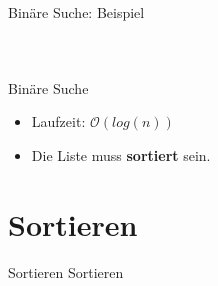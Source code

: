 \documentclass[18pt]{beamer}
\begin{document}
\begin{frame}{Binäre Suche: Beispiel}
\begin{center}
\begin{tabular}{|c|c|c|c|c|c|c|c|c|c|c|c|c|c|c|c|}
            \hline
        \end{tabular}
        \pause
        \begin{tabular}{|c|c|c|c|c|c|c|c|c|c|c|c|c|c|c|c|}
            \hline
            \cellcolor{darkgrey}{3} & \cellcolor{darkgrey}{4} & \cellcolor{darkgrey}{4} & \cellcolor{darkgrey}{5} & \cellcolor{darkgrey}{6} & \cellcolor{darkgrey}{7} & \cellcolor{lime}{8} & \cellcolor{lightgreen}{10} & \cellcolor{darkgrey}{11} & \cellcolor{darkgrey}{14} & \cellcolor{darkgrey}{17} & \cellcolor{darkgrey}{22} & \cellcolor{darkgrey}{24} & \cellcolor{darkgrey}{29} & \cellcolor{darkgrey}{32} & \cellcolor{darkgrey}{42} \\
            \hline
        \end{tabular}
        \pause
        \begin{tabular}{|c|c|c|c|c|c|c|c|c|c|c|c|c|c|c|c|}
            \hline
            \cellcolor{darkgrey}{3} & \cellcolor{darkgrey}{4} & \cellcolor{darkgrey}{4} & \cellcolor{darkgrey}{5} & \cellcolor{darkgrey}{6} & \cellcolor{darkgrey}{7} & \cellcolor{awesome}{8} & \cellcolor{darkgrey}{10} & \cellcolor{darkgrey}{11} & \cellcolor{darkgrey}{14} & \cellcolor{darkgrey}{17} & \cellcolor{darkgrey}{22} & \cellcolor{darkgrey}{24} & \cellcolor{darkgrey}{29} & \cellcolor{darkgrey}{32} & \cellcolor{darkgrey}{42} \\
            \hline
        \end{tabular}
    \end{center}
\end{frame}


\begin{frame}{Binäre Suche}
    \begin{itemize}
        \item Laufzeit: $\mathcal{O}(log(n))$
        \item Die Liste muss \textbf{sortiert} sein.
    \end{itemize}
\end{frame}

\section{Sortieren}

\begin{frame}{Sortieren}
    \center
    \Huge{Sortieren}
\end{frame}
\end{document}
